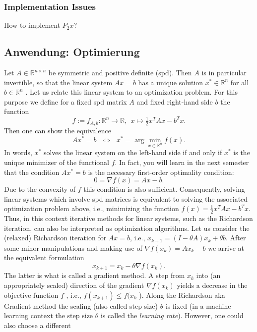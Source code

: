 \subsubsection{Implementation Issues}
How to implement $P_2 x$?

\newpage
\subsection{Anwendung: Optimierung}
	Let $A \in \mathbb{R}^{n \times n}$ be symmetric and positive definite (spd). Then $A$ is in particular invertible, so that the
linear system
$Ax = b$
has a unique solution $x^* \in \mathbb{R}^{n}$  for all $b \in \mathbb{R}^{n}$  . Let us relate this linear system to an optimization problem.
For this purpose we define for a fixed spd matrix $A$ and fixed right-hand side $b$ the function
$$f:=f_{A,b} : \mathbb{R}^{n}  \to \mathbb{R}, ~~x  \mapsto \tfrac{1}{2} x^T Ax - b^T x.$$
Then one can show the equivalence
$$Ax^* = b ~~~\iff~~~	x^* = \arg \min_{x\in\mathbb{R}^{n}} f (x).	$$
In words, $x^*$ solves the linear system on the left-hand side if and only if $x^*$ is the unique minimizer of the
functional $f$. In fact, you will learn in the next semester that the condition $Ax^* = b$ is the necessary first-order optimality
condition:
$$0 = \nabla f (x) = Ax - b.$$
Due to the convexity of $f$ this condition is also sufficient.
Consequently, solving linear systems which involve spd matrices is equivalent to solving the associated
optimization problem above, i.e., minimizing the function $f (x) = \tfrac{1}{2} x^T Ax - b^T x$. Thus, in this context iterative methods
for linear systems, such as the Richardson iteration, can also be interpreted as optimization algorithms.
Let us consider the (relaxed) Richardson iteration for $Ax = b$, i.e.,
$x_{k+1} = (I - \theta A)x_{k} + \theta b$.
After some minor manipulations and making use of $\nabla f (x_{k} ) = Ax_{k} - b$ we arrive at the equivalent
formulation
$$x_{k+1} = x_{k} - \theta\nabla f (x_{k} ).$$
The latter is what is called a gradient method. A step from $x_{k}$ into (an appropriately scaled) direction of the gradient
$\nabla f (x_{k} )$ yields a decrease in the objective function $f$ , i.e., $f (x_{k+1} ) \leq  f (x_{k}$ ). Along the Richardson aka Gradient method the scaling (also called step size) $\theta$ is fixed (in a machine learning context the step size $\theta$ is called the \textit{learning rate}). However, one could also choose a different
